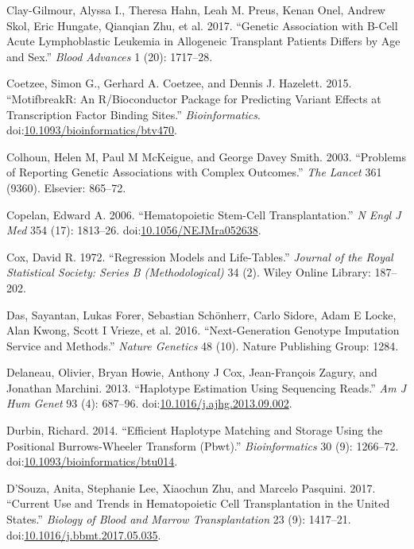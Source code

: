 \documentclass[]{DissertateOSU}
\begin{document}
\hypertarget{ref-Clay_2017}{}
Clay-Gilmour, Alyssa I., Theresa Hahn, Leah M. Preus, Kenan Onel, Andrew
Skol, Eric Hungate, Qianqian Zhu, et al. 2017. ``Genetic Association
with B-Cell Acute Lymphoblastic Leukemia in Allogeneic Transplant
Patients Differs by Age and Sex.'' \emph{Blood Advances} 1 (20):
1717--28.

\hypertarget{ref-motifbreakr}{}
Coetzee, Simon G., Gerhard A. Coetzee, and Dennis J. Hazelett. 2015.
``MotifbreakR: An R/Bioconductor Package for Predicting Variant Effects
at Transcription Factor Binding Sites.'' \emph{Bioinformatics}.
doi:\href{https://doi.org/10.1093/bioinformatics/btv470}{10.1093/bioinformatics/btv470}.

\hypertarget{ref-colhoun2003}{}
Colhoun, Helen M, Paul M McKeigue, and George Davey Smith. 2003.
``Problems of Reporting Genetic Associations with Complex Outcomes.''
\emph{The Lancet} 361 (9360). Elsevier: 865--72.

\hypertarget{ref-copelan_2006}{}
Copelan, Edward A. 2006. ``Hematopoietic Stem-Cell Transplantation.''
\emph{N Engl J Med} 354 (17): 1813--26.
doi:\href{https://doi.org/10.1056/NEJMra052638}{10.1056/NEJMra052638}.

\hypertarget{ref-cox1972}{}
Cox, David R. 1972. ``Regression Models and Life-Tables.'' \emph{Journal
of the Royal Statistical Society: Series B (Methodological)} 34 (2).
Wiley Online Library: 187--202.

\hypertarget{ref-michigan_imputation}{}
Das, Sayantan, Lukas Forer, Sebastian Schönherr, Carlo Sidore, Adam E
Locke, Alan Kwong, Scott I Vrieze, et al. 2016. ``Next-Generation
Genotype Imputation Service and Methods.'' \emph{Nature Genetics} 48
(10). Nature Publishing Group: 1284.

\hypertarget{ref-shapeit2}{}
Delaneau, Olivier, Bryan Howie, Anthony J Cox, Jean-François Zagury, and
Jonathan Marchini. 2013. ``Haplotype Estimation Using Sequencing
Reads.'' \emph{Am J Hum Genet} 93 (4): 687--96.
doi:\href{https://doi.org/10.1016/j.ajhg.2013.09.002}{10.1016/j.ajhg.2013.09.002}.

\hypertarget{ref-durbin_2014}{}
Durbin, Richard. 2014. ``Efficient Haplotype Matching and Storage Using
the Positional Burrows-Wheeler Transform (Pbwt).'' \emph{Bioinformatics}
30 (9): 1266--72.
doi:\href{https://doi.org/10.1093/bioinformatics/btu014}{10.1093/bioinformatics/btu014}.

\hypertarget{ref-DSouza_2017}{}
D'Souza, Anita, Stephanie Lee, Xiaochun Zhu, and Marcelo Pasquini. 2017.
``Current Use and Trends in Hematopoietic Cell Transplantation in the
United States.'' \emph{Biology of Blood and Marrow Transplantation} 23
(9): 1417--21.
doi:\href{https://doi.org/10.1016/j.bbmt.2017.05.035}{10.1016/j.bbmt.2017.05.035}.
\end{document}
